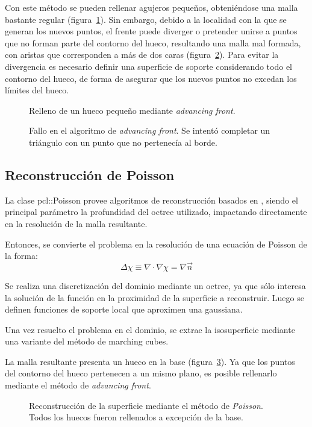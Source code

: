 		Con este método se pueden rellenar agujeros pequeños, obteniéndose una malla bastante regular (figura~\ref{fig:fill_good}).
		Sin embargo, debido a la localidad con la que se generan los nuevos
		puntos, el frente puede diverger o pretender unirse a puntos que no
		forman parte del contorno del hueco, resultando una malla mal formada,
		con aristas que corresponden a más de dos caras (figura~\ref{fig:fill_bad}).
		Para evitar la divergencia es necesario definir una superficie de
		soporte considerando todo el contorno del hueco, de forma de asegurar
		que los nuevos puntos no excedan los límites del hueco.

	\begin{figure}
		\caption{\label{fig:fill_good}Relleno de un hueco pequeño mediante \emph{advancing front}.}
	\end{figure}

	\begin{figure}
		\caption{\label{fig:fill_bad}Fallo en el algoritmo de \emph{advancing front}. Se intentó completar un triángulo con un punto que no pertenecía al borde.}
	\end{figure}

	\subsection{Reconstrucción de Poisson}
	La clase pcl::Poisson provee algoritmos de reconstrucción basados en \cite{Kazhdan:2006:PSR:1281957.1281965}, %
	siendo el principal parámetro la profundidad del octree utilizado,
	impactando directamente en la resolución de la malla resultante.


	Entonces, se convierte el problema en la resolución de una ecuación de Poisson de la forma:
	\[\Delta\chi \equiv \nabla \cdot\nabla\chi = \nabla \vec{n}\]

	Se realiza una discretización del dominio mediante un octree, ya que sólo
	interesa la solución de la función en la proximidad de la superficie a
	reconstruir.
	Luego se definen funciones de soporte local que aproximen una gaussiana.

	Una vez resuelto el problema en el dominio, se extrae la isosuperficie mediante una variante del método de marching cubes.

	La malla resultante presenta un hueco en la base (figura~\ref{fig:fill_poisson}).
	Ya que los puntos del contorno del hueco pertenecen a un mismo plano, es posible rellenarlo mediante el método de \emph{advancing front}.

	\begin{figure}
		\caption{\label{fig:fill_poisson}Reconstrucción de la superficie mediante el método de \emph{Poisson}. Todos los huecos fueron rellenados a excepción de la base.}
	\end{figure}

